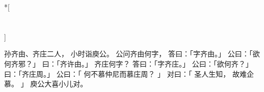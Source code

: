 
\switchcolumn[0]*[\section{}]

孙齐由、齐庄二人，
小时诣庾公。
公问齐由何字，
答曰：「字齐由。」
公曰：「欲何齐邪？」
曰：「齐许由。」
齐庄何字？
答曰：「字齐庄。」
公曰：「欲何齐？」
曰：「齐庄周。」
公曰：「
    何不慕仲尼而慕庄周？
」
对曰：「
    圣人生知，
    故难企慕。
」
庾公大喜小儿对。

\switchcolumn


